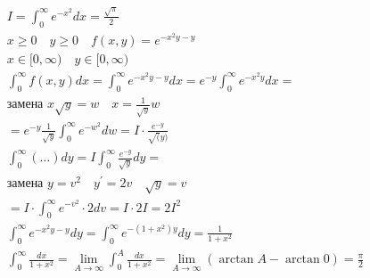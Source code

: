 \documentclass[main]{subfiles}
\begin{document}
     \begin{example}
          \begin{gather*}
               I = \int^\infty_0 e^{-x^2} dx = \frac{\sqrt{\pi}}{2} \\
               x \geq 0 \quad y \geq 0 \quad f(x,y) = e^{-x^2y - y} \tag{1} \\
               x \in [0, \infty) \quad y \in [0, \infty) \\
                \int^\infty_0 f(x,y) dx = \int^\infty_0 e^{-x^2y - y} dx = 
               e^{-y} \int^\infty_0 e^{-x^2y} dx = \\
               \text{замена } x\sqrt{y} = w \quad x = \frac{1}{\sqrt{y}}w \\
                = e^{-y} \frac{1}{\sqrt{y}} \int^\infty_0 e^{-w^2} dw = I \cdot \frac {e^{-y}}{\sqrt(y)} \tag{2} \\
               \int^\infty_0 (\ldots)dy = I \int^\infty_0 \frac{e^{-y}}{\sqrt{y}}dy = \\
               \text{замена } y = v^2 \quad y^\prime = 2v \quad \sqrt{y} = v \\
                =I \cdot \int^\infty_0 e^{-v^2} \cdot 2dv = I \cdot 2I = 2I^2 \tag{3} \\
                \int^\infty_0 e^{-x^2y -y}dy = \int^\infty_0 e^{-(1+x^2)y} dy = \frac{1}{1+x^2} \tag{4} \\
                 \int^\infty_0 \frac{dx}{1+x^2} = \underset{A \to \infty}{\lim} \int^A_0 \frac{dx}{1+x^2} = \underset{A \to \infty}{\lim} (\arctan A - \arctan 0) = \frac{\pi}{2} \tag{5}
          \end{gather*}
     \end{example}
    
\end{document}

